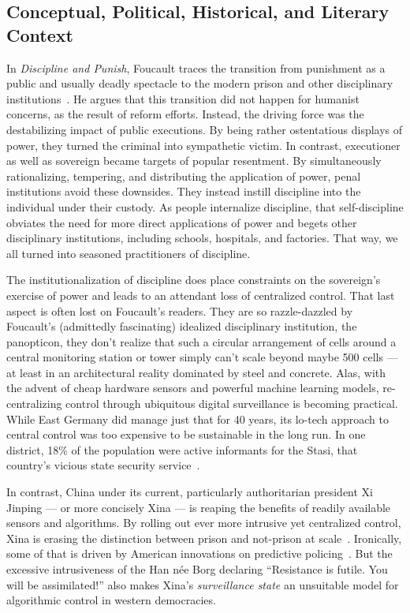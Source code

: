 \subsection{Conceptual, Political, Historical, and Literary Context}
\label{sec:context}

In \emph{Discipline and Punish}, Foucault traces the transition from punishment
as a public and usually deadly spectacle to the modern prison and other
disciplinary institutions~\cite{Foucault1979}. He argues that this transition
did not happen for humanist concerns, as the result of reform efforts. Instead,
the driving force was the destabilizing impact of public executions. By being
rather ostentatious displays of power, they turned the criminal into sympathetic
victim. In contrast, executioner as well as sovereign became targets of popular
resentment. By simultaneously rationalizing, tempering, and distributing the
application of power, penal institutions avoid these downsides. They instead
instill discipline into the individual under their custody. As people
internalize discipline, that self-discipline obviates the need for more direct
applications of power and begets other disciplinary institutions, including
schools, hospitals, and factories. That way, we all turned into seasoned
practitioners of discipline.

The institutionalization of discipline does place constraints on the sovereign's
exercise of power and leads to an attendant loss of centralized control. That
last aspect is often lost on Foucault's readers. They are so razzle-dazzled by
Foucault's (admittedly fascinating) idealized disciplinary institution, the
panopticon, they don't realize that such a circular arrangement of cells around
a central monitoring station or tower simply can't scale beyond maybe 500 cells
--- at least in an architectural reality dominated by steel and concrete. Alas,
with the advent of cheap hardware sensors and powerful machine learning models,
re-centralizing control through ubiquitous digital surveillance is becoming
practical. While East Germany did manage just that for 40 years, its lo-tech
approach to central control was too expensive to be sustainable in the long run.
In one district, 18\% of the population were active informants for the Stasi,
that country's vicious state security service~\cite{Kellerhoff2022}.

In contrast, China under its current, particularly authoritarian president Xi
Jinping --- or more concisely Xina --- is reaping the benefits of readily
available sensors and algorithms. By rolling out ever more intrusive yet
centralized control, Xina is erasing the distinction between prison and
not-prison at scale~\cite{Grauer2021,MozurXiaoea2022,SmithIV2016}. Ironically,
some of that is driven by American innovations on predictive
policing~\cite{PerryMcInnisea2013,SmithIV2016,Sprick2019}. But the excessive
intrusiveness of the Han n\'ee Borg declaring ``Resistance is futile. You will
be assimilated!'' also makes Xina's \emph{surveillance state} an unsuitable
model for algorithmic control in western democracies.

